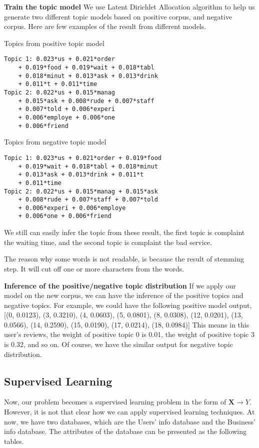 \documentclass[10pt,twocolumn,letterpaper]{article}
\begin{document}
\textbf{Train the topic model} We use Latent Dirichlet Allocation algorithm to help us generate two different topic models based on positive corpus, and negative corpus. Here are few examples of the result from different models.

Topics from positive topic model
{\small\begin{verbatim}
Topic 1: 0.023*us + 0.021*order
    + 0.019*food + 0.019*wait + 0.018*tabl
    + 0.018*minut + 0.013*ask + 0.013*drink
    + 0.011*t + 0.011*time
Topic 2: 0.022*us + 0.015*manag
    + 0.015*ask + 0.008*rude + 0.007*staff
    + 0.007*told + 0.006*experi 
    + 0.006*employe + 0.006*one 
    + 0.006*friend
\end{verbatim}
}

Topics from negative topic model
{\small\begin{verbatim}
Topic 1: 0.023*us + 0.021*order + 0.019*food 
    + 0.019*wait + 0.018*tabl + 0.018*minut 
    + 0.013*ask + 0.013*drink + 0.011*t 
    + 0.011*time
Topic 2: 0.022*us + 0.015*manag + 0.015*ask 
    + 0.008*rude + 0.007*staff + 0.007*told 
    + 0.006*experi + 0.006*employe 
    + 0.006*one + 0.006*friend
\end{verbatim}
}

We still can easily infer the topic from these result, the first topic is complaint the waiting time, and the second topic is complaint the bad service.

The reason why some words is not readable, is because the result of stemming step. It will cut off one or more characters from the words.

\textbf{Inference of the positive/negative topic distribution} If we apply our model on the new corpus, we can have the inference of the positive topics and negative topics. For example, we could have the following positive model output, [(0, 0.0123), (3, 0.3210), (4, 0.0603), (5, 0.0801), (8, 0.0308), (12, 0.0201), (13, 0.0566), (14, 0.2590), (15, 0.0190), (17, 0.0214), (18, 0.0984)] This means in this user’s reviews, the weight of positive topic 0 is 0.01, the weight of positive topic 3 is 0.32, and so on. Of course, we have the similar output for negative topic distribution.

\subsection{Supervised Learning}
Now, our problem becomes a supervised learning problem in the form of $\mathbf{X} \rightarrow Y$. However, it is not that clear how we can apply supervised learning techniques. At now, we have two databases, which are the Users’ info database and the Business’ info database. The attributes of the database can be presented as the following tables.
\end{document}
